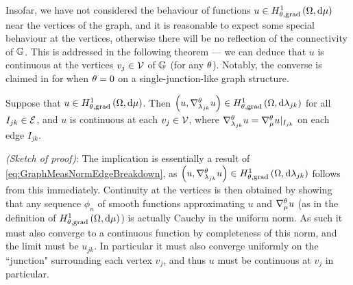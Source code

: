Insofar, we have not considered the behaviour of functions $u\in H^1_{\theta, \mathrm{grad}}\left( \Omega, \mathrm{d}\mu \right)$ near the vertices of the graph, and it is reasonable to expect some special behaviour at the vertices, otherwise there will be no reflection of the connectivity of $\mathbb{G}$.
This is addressed in the following theorem --- we can deduce that $u$ is continuous at the vertices $v_j\in \mathcal{V}$ of $\mathbb{G}$ (for any $\theta$).
Notably, the converse is claimed in \cite[Section~4]{zhikov2002homogenization} for when $\theta=0$ on a single-junction-like graph structure.
\begin{theorem} \label{thm:CharOfGradSob}
	Suppose that $u \in H^1_{\theta, \mathrm{grad}}\left( \Omega, \mathrm{d}\mu \right)$.
	Then $\left( u, \nabla^{\theta}_{\lambda_{jk}}u \right)\in H^1_{\theta, \mathrm{grad}}\left( \Omega, \mathrm{d}\lambda_{jk} \right)$ for all $I_{jk}\in \mathcal{E}$, and $u$ is continuous at each $v_j\in \mathcal{V}$, where $\nabla^{\theta}_{\lambda_{jk}}u = \nabla^{\theta}_{\mu}u\vert_{I_{jk}}$ on each edge $I_{jk}$.
\end{theorem}
\textit{(Sketch of proof)}: 
	The implication is essentially a result of \eqref{eq:GraphMeasNormEdgeBreakdown}, as $\left( u, \nabla^{\theta}_{\lambda_{jk}}u \right)\in H^1_{\theta, \mathrm{grad}}\left( \Omega, \mathrm{d}\lambda_{jk} \right)$ follows from this immediately.
	Continuity at the vertices is then obtained by showing that any sequence $\phi_n$ of smooth functions approximating $u$ and $\nabla^{\theta}_\mu u$ (as in the definition of $H^1_{\theta, \mathrm{grad}}\left( \Omega, \mathrm{d}\mu \right)$) is actually Cauchy in the uniform norm.
	As such it must also converge to a continuous function by completeness of this norm, and the limit must be $u_{jk}$.
	In particular it must also converge uniformly on the ``junction" surrounding each vertex $v_j$, and thus $u$ must be continuous at $v_j$ in particular.
